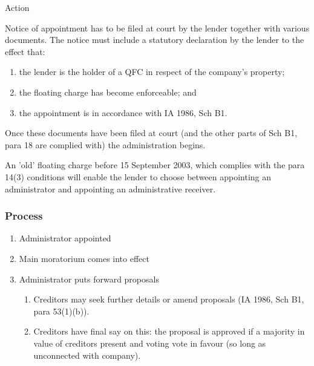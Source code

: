\documentclass[
]{article}
\providecommand{\tightlist}{%
  \setlength{\itemsep}{0pt}\setlength{\parskip}{0pt}}
\newenvironment{env-862347ee-a221-4f52-a3b4-3eedf85d51d9}
{
    \savenotes\tcolorbox[blanker,breakable,left=5pt,borderline west={2pt}{-4pt}{aquamarine}]
}
{
    \endtcolorbox\spewnotes
}
\begin{document}
\begin{env-862347ee-a221-4f52-a3b4-3eedf85d51d9}

Action

Notice of appointment has to be filed at court by the lender together
with various documents. The notice must include a statutory declaration
by the lender to the effect that:

\begin{enumerate}
\tightlist
\item
  the lender is the holder of a QFC in respect of the company's
  property;
\item
  the floating charge has become enforceable; and
\item
  the appointment is in accordance with IA 1986, Sch B1.
\end{enumerate}

\end{env-862347ee-a221-4f52-a3b4-3eedf85d51d9}

Once these documents have been filed at court (and the other parts of
Sch B1, para 18 are complied with) the administration begins.

An 'old' floating charge before 15 September 2003, which complies with
the para 14(3) conditions will enable the lender to choose between
appointing an administrator and appointing an administrative receiver.

\hypertarget{process}{%
\subsubsection{Process}\label{process}}

\begin{enumerate}
\tightlist
\item
  Administrator appointed
\item
  Main moratorium comes into effect
\item
  Administrator puts forward proposals

  \begin{enumerate}
  \tightlist
  \item
    Creditors may seek further details or amend proposals (IA 1986, Sch
    B1, para 53(1)(b)).
  \item
    Creditors have final say on this: the proposal is approved if a
    majority in value of creditors present and voting vote in favour (so
    long as unconnected with company).
  \end{enumerate}
\end{enumerate}
\end{document}
